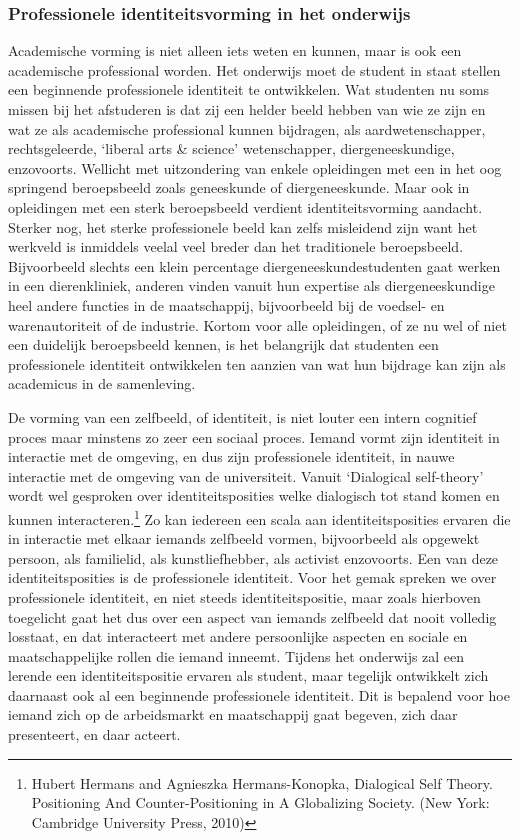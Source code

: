 \documentclass{jote-book}
\begin{document}
	\subsubsection{Professionele identiteitsvorming in het onderwijs}



	Academische vorming is niet alleen iets weten en kunnen, maar is ook een academische professional worden. Het onderwijs moet de student in staat stellen een beginnende professionele identiteit te ontwikkelen. Wat studenten nu soms missen bij het afstuderen is dat zij een helder beeld hebben van wie ze zijn en wat ze als academische professional kunnen bijdragen, als aardwetenschapper, rechtsgeleerde, ‘liberal arts \& science' wetenschapper, diergeneeskundige, enzovoorts. Wellicht met uitzondering van enkele opleidingen met een in het oog springend beroepsbeeld zoals geneeskunde of diergeneeskunde. Maar ook in opleidingen met een sterk beroepsbeeld verdient identiteitsvorming aandacht. Sterker nog, het sterke professionele beeld kan zelfs misleidend zijn want het werkveld is inmiddels veelal veel breder dan het traditionele beroepsbeeld. Bijvoorbeeld slechts een klein percentage diergeneeskundestudenten gaat werken in een dierenkliniek, anderen vinden vanuit hun expertise als diergeneeskundige heel andere functies in de maatschappij, bijvoorbeeld bij de voedsel- en warenautoriteit of de industrie. Kortom voor alle opleidingen, of ze nu wel of niet een duidelijk beroepsbeeld kennen, is het belangrijk dat studenten een professionele identiteit ontwikkelen ten aanzien van wat hun bijdrage kan zijn als academicus in de samenleving.



	De vorming van een zelfbeeld, of identiteit, is niet louter een intern cognitief proces maar minstens zo zeer een sociaal proces. Iemand vormt zijn identiteit in interactie met de omgeving, en dus zijn professionele identiteit, in nauwe interactie met de omgeving van de universiteit. Vanuit ‘Dialogical self-theory' wordt wel gesproken over identiteitsposities welke dialogisch tot stand komen en kunnen interacteren.\footnote{Hubert Hermans and Agnieszka Hermans-Konopka, Dialogical Self Theory. Positioning And Counter-Positioning in A Globalizing Society. (New York: Cambridge University Press, 2010)} Zo kan iedereen een scala aan identiteitsposities ervaren die in interactie met elkaar iemands zelfbeeld vormen, bijvoorbeeld als opgewekt persoon, als familielid, als kunstliefhebber, als activist enzovoorts. Een van deze identiteitsposities is de professionele identiteit. Voor het gemak spreken we over professionele identiteit, en niet steeds identiteitspositie, maar zoals hierboven toegelicht gaat het dus over een aspect van iemands zelfbeeld dat nooit volledig losstaat, en dat interacteert met andere persoonlijke aspecten en sociale en maatschappelijke rollen die iemand inneemt. Tijdens het onderwijs zal een lerende een identiteitspositie ervaren als student, maar tegelijk ontwikkelt zich daarnaast ook al een beginnende professionele identiteit. Dit is bepalend voor hoe iemand zich op de arbeidsmarkt en maatschappij gaat begeven, zich daar presenteert, en daar acteert.
\end{document}
